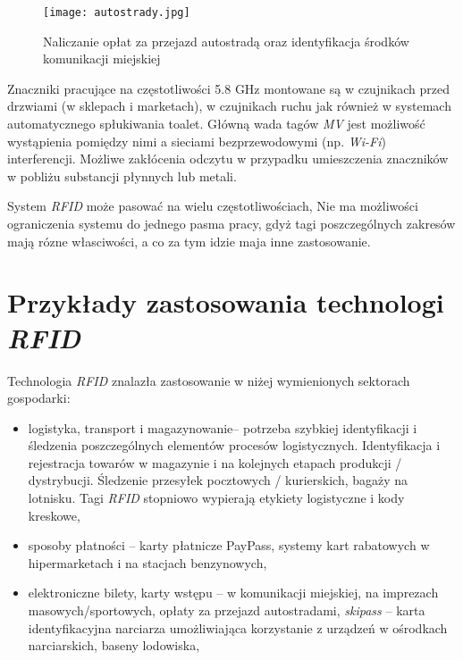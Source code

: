\begin{itemize}
\begin{itemize}
\begin{itemize}
	\begin{figure}[h!]
	\centering
	    \texttt{[image: autostrady.jpg]}
	    \caption{Naliczanie opłat za przejazd autostradą oraz identyfikacja środków komunikacji miejskiej}
	\end{figure}

	Znaczniki pracujące na częstotliwości 5.8 GHz montowane są w czujnikach przed drzwiami (w sklepach i marketach), w czujnikach ruchu jak również w systemach automatycznego spłukiwania toalet.
	Główną wada tagów \emph{MV} jest możliwość wystąpienia pomiędzy nimi a sieciami bezprzewodowymi (np. \emph{Wi-Fi}) interferencji. Możliwe zakłócenia odczytu w przypadku umieszczenia znaczników w pobliżu substancji płynnych lub metali.

\end{itemize}

System \emph{RFID} może pasować na wielu częstotliwościach, Nie ma możliwości ograniczenia systemu do jednego pasma pracy, gdyż tagi poszczególnych zakresów mają rózne własciwości, a co za tym idzie maja inne zastosowanie.

\newpage

\section{Przykłady zastosowania technologi \emph{RFID}}

Technologia \emph{RFID} znalazła zastosowanie w niżej wymienionych sektorach gospodarki: 

\begin{itemize}\setlength{\itemsep}{0pt}
	\item logistyka, transport i magazynowanie– potrzeba szybkiej identyfikacji i śledzenia poszczególnych elementów procesów logistycznych. Identyfikacja i rejestracja towarów w magazynie i na kolejnych etapach produkcji / dystrybucji.  Śledzenie przesyłek pocztowych / kurierskich, bagaży na lotnisku.  Tagi \emph{RFID} stopniowo wypierają etykiety logistyczne i kody kreskowe,

	\item sposoby płatności – karty płatnicze PayPass, systemy kart rabatowych w hipermarketach i na stacjach benzynowych, 

	\item elektroniczne bilety, karty wstępu – w komunikacji miejskiej, na imprezach masowych/sportowych, opłaty za przejazd autostradami, \emph{skipass} – karta identyfikacyjna narciarza umożliwiająca korzystanie z urządzeń w ośrodkach narciarskich, baseny lodowiska,


\end{itemize}
\end{itemize}
\end{itemize}
